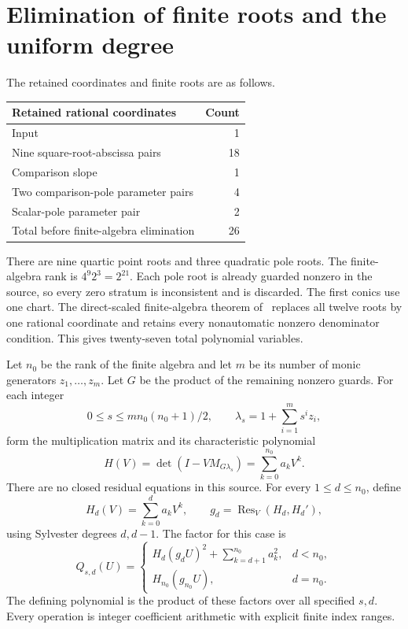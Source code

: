 \documentclass[11pt,a4paper]{article}
\begin{document}
\section{Elimination of finite roots and the uniform degree}

The retained coordinates and finite roots are as follows.
\begin{center}
\begin{tabular}{lr}
\toprule
Retained rational coordinates & Count\\
\midrule
Input & 1\\
Nine square-root-abscissa pairs & 18\\
Comparison slope & 1\\
Two comparison-pole parameter pairs & 4\\
Scalar-pole parameter pair & 2\\
\midrule
Total before finite-algebra elimination & 26\\
\bottomrule
\end{tabular}
\end{center}
There are nine quartic point roots and three quadratic pole roots.
The finite-algebra rank is $4^9 2^3=2^{21}$. Each pole root is
already guarded nonzero in the source, so every zero stratum is
inconsistent and is discarded. The first conics use one chart.
The direct-scaled finite-algebra theorem of~\cite{Weighted} replaces
all twelve roots by one rational coordinate and retains every
nonautomatic nonzero denominator condition. This gives twenty-seven
total polynomial variables.

Let $n_0$ be the rank of the finite algebra and let $m$ be its
number of monic generators $z_1,\ldots,z_m$. Let $G$ be the product
of the remaining nonzero guards. For each integer
\[
 0\le s\le m n_0(n_0+1)/2,\qquad
 \lambda_s=1+\sum_{i=1}^{m}s^i z_i,
\]
form the multiplication matrix and its characteristic polynomial
\[
 H(V)=\det(I-VM_{G\lambda_s})=\sum_{k=0}^{n_0}a_kV^k.
\]
There are no closed residual equations in this source. For every
$1\le d\le n_0$, define
\[
 H_d(V)=\sum_{k=0}^d a_kV^k,\qquad
 g_d=\operatorname{Res}_V(H_d,H_d'),
\]
using Sylvester degrees $d,d-1$. The factor for this case is
\[
 Q_{s,d}(U)=
 \begin{cases}
 H_d(g_dU)^2+\displaystyle\sum_{k=d+1}^{n_0}a_k^2,&d<n_0,\\[1mm]
 H_{n_0}(g_{n_0}U),&d=n_0.
 \end{cases}
\]
The defining polynomial is the product of these factors over all
specified $s,d$. Every operation is integer coefficient arithmetic
with explicit finite index ranges.
\end{document}
